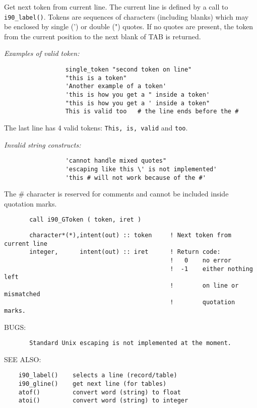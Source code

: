     Get next token from current line. The current line is defined by a
    call to {\tt i90\_label()}. Tokens are sequences of characters (including
    blanks) which may be enclosed by single (') or double (") quotes. 
    If no quotes are present, the token from the current position to the next
    blank of TAB is returned.
    
    {\em Examples of valid token:}
  
    \begin{verbatim}
                 single_token "second token on line"
                 "this is a token"
                 'Another example of a token'
                 'this is how you get a " inside a token'
                 "this is how you get a ' inside a token"
                 This is valid too   # the line ends before the #
    \end{verbatim}
    The last line has 4 valid tokens: {\tt This, is, valid} and {\tt too}.
    
    {\em Invalid string constructs:}
  
    \begin{verbatim}
                 'cannot handle mixed quotes"
                 'escaping like this \' is not implemented'
                 'this # will not work because of the #'
    \end{verbatim}
    The \# character is reserved for comments and cannot be included
    inside quotation marks.
  
\begin{verbatim}       call i90_GToken ( token, iret )\end{verbatim}
\begin{verbatim}
       character*(*),intent(out) :: token     ! Next token from current line
       integer,      intent(out) :: iret      ! Return code:
                                              !   0    no error
                                              !  -1    either nothing left
                                              !        on line or mismatched
                                              !        quotation marks.
 \end{verbatim}{\sf BUGS:}
\begin{verbatim}       Standard Unix escaping is not implemented at the moment.
       \end{verbatim}{\sf SEE ALSO:}
\begin{verbatim}    i90_label()    selects a line (record/table)
    i90_gline()    get next line (for tables)
    atof()         convert word (string) to float
    atoi()         convert word (string) to integer
    \end{verbatim}%
 
